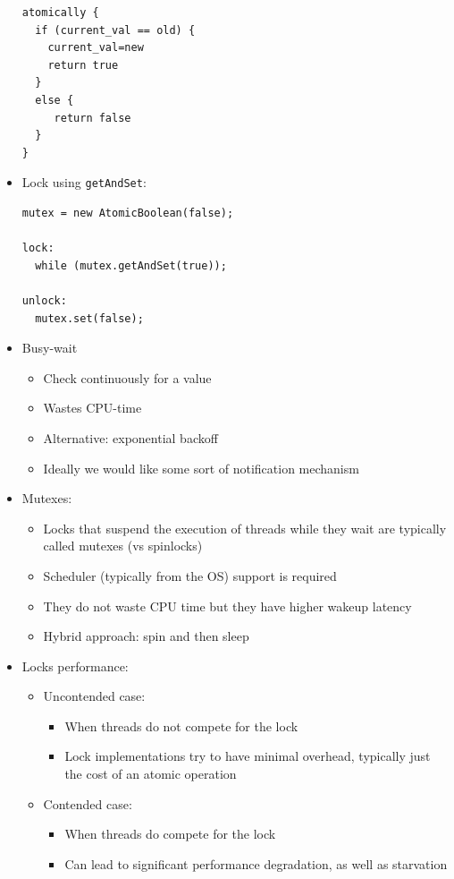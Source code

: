 \documentclass[a4paper]{article}
\newcommand{\inline}[1]{\lstinline!#1!}%
\begin{document}
\begin{itemize}
\begin{lstlisting}
atomically {
  if (current_val == old) {
    current_val=new
    return true
  }
  else {
     return false
  }
}
\end{lstlisting}
\item Lock using \inline{getAndSet}: 
\begin{lstlisting}
mutex = new AtomicBoolean(false);

lock:
  while (mutex.getAndSet(true));

unlock:
  mutex.set(false);
\end{lstlisting}
\item Busy-wait
\begin{itemize}
\item Check continuously for a value
\item Wastes CPU-time 
\item Alternative: exponential backoff
\item Ideally we would like some sort of notification mechanism
\end{itemize}
\item Mutexes: 
\begin{itemize}
\item Locks that suspend the execution of threads while they wait are typically called mutexes (vs spinlocks)
\item Scheduler (typically from the OS) support is required
\item They do not waste CPU time but they have higher wakeup latency
\item Hybrid approach: spin and then sleep
\end{itemize}
\item Locks performance: 
\begin{itemize}
\item Uncontended case: 
\begin{itemize}
\item When threads do not compete for the lock
\item Lock implementations try to have minimal overhead, typically just the cost of an atomic operation
\end{itemize}
\item Contended case: 
\begin{itemize}
\item When threads do compete for the lock
\item Can lead to significant performance degradation, as well as starvation
\end{itemize}
\end{itemize}

\end{itemize}
\end{document}
